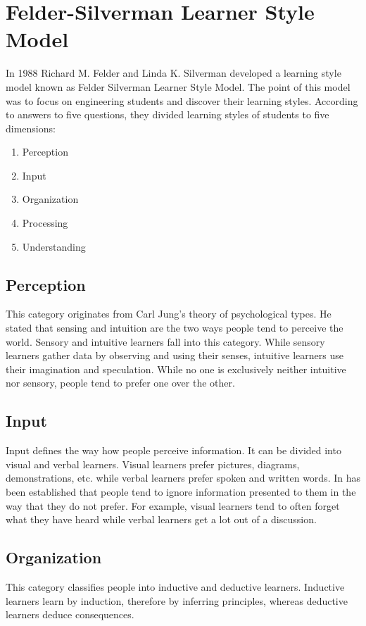 \documentclass[10pt,twoside,english,a4paper]{article}
\begin{document}
\section{Felder-Silverman Learner Style Model} \label{FS}
In 1988 Richard M. Felder and Linda K. Silverman developed a learning style model known as Felder Silverman Learner Style Model. The point of this model was to focus on engineering students and discover their learning styles.\cite{AdaptiveEL} According to answers to five questions, they divided learning styles of students to five dimensions:
\begin{enumerate}
\item Perception
\item Input
\item Organization
\item Processing
\item Understanding
\end{enumerate}\cite{FelderArticle}
{\subsection{Perception}
This category originates from Carl Jung's theory of psychological types. He stated that sensing and intuition are the two ways people tend to perceive the world. Sensory and intuitive learners fall into this category. While sensory learners gather data by observing and using their senses, intuitive learners use their imagination and speculation. While no one is exclusively neither intuitive nor sensory, people tend to prefer one over the other.\cite{FelderArticle}}
{\subsection{Input}
Input defines the way how people perceive information. It can be divided into visual and verbal learners. Visual learners prefer pictures, diagrams, demonstrations, etc. while verbal learners prefer spoken and written words. In has been established that people tend to ignore information presented to them in the way that they do not prefer. For example, visual learners tend to often forget what they have heard while verbal learners get a lot out of a discussion.\cite{FelderArticle}}
{\subsection{Organization}
This category classifies people into inductive and deductive learners. Inductive learners learn by induction, therefore by inferring principles, whereas deductive learners deduce consequences.\cite{FelderArticle}}
\end{document}
